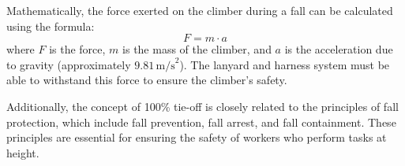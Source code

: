 Mathematically, the force exerted on the climber during a fall can be calculated using the formula:
\[
F = m \cdot a
\]
where \( F \) is the force, \( m \) is the mass of the climber, and \( a \) is the acceleration due to gravity (approximately \( 9.81 \, \text{m/s}^2 \)). The lanyard and harness system must be able to withstand this force to ensure the climber’s safety.

Additionally, the concept of 100\% tie-off is closely related to the principles of fall protection, which include fall prevention, fall arrest, and fall containment. These principles are essential for ensuring the safety of workers who perform tasks at height.

